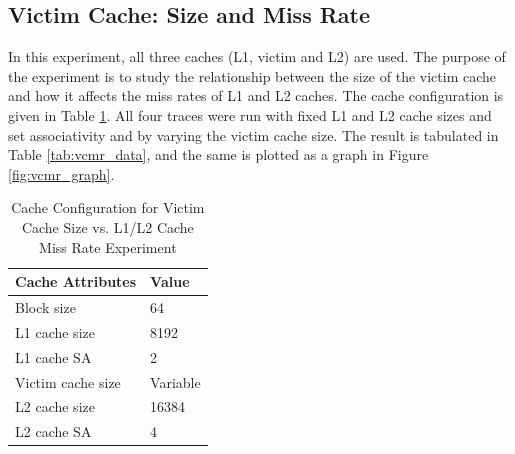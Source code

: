 \documentclass[a4paper]{article}
\begin{document}

\subsection{Victim Cache: Size and Miss Rate}
In this experiment, all three caches (L1, victim and L2) are used. The purpose of the experiment is to study the relationship between the size of the victim cache and how it affects the miss rates of L1 and L2 caches. The cache configuration is given in Table \ref{tab:vcmr_config}. All four traces were run with fixed L1 and L2 cache sizes and set associativity and by varying the victim cache size. The result is tabulated in Table \ref{tab:vcmr_data}, and the same is plotted as a graph in Figure \ref{fig:vcmr_graph}.

\begin{table}[htbp]
    \centering
    \begin{center}
        \begin{tabular}{|l|l|}
            \hline
            \bf Cache Attributes & \bf Value \\ \hline
            Block size &  64 \\
            L1 cache size & 8192 \\
            L1 cache SA & 2 \\
            Victim cache size & Variable \\
            L2 cache size & 16384  \\
            L2 cache SA & 4 \\
            \hline
        \end{tabular}
        \captionsetup{justification=centering}
        \caption{Cache Configuration for Victim Cache Size vs. L1/L2 Cache Miss Rate Experiment}
        \label{tab:vcmr_config}
    \end{center}
\end{table}
\end{document}
